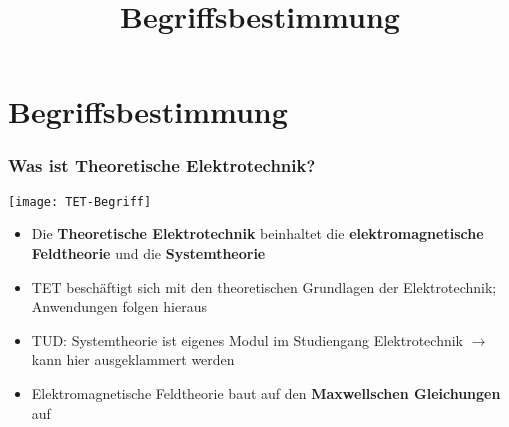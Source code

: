 

\title[TET: Begriffsbestimmung]{Begriffsbestimmung}


\maketitle

\section{Begriffsbestimmung}

\begin{frame}
  \frametitle{Was ist Theoretische Elektrotechnik?}
\centerline{\texttt{[image: TET-Begriff]}}

\begin{itemize}[<+->]
\item Die \textbf{Theoretische Elektrotechnik} beinhaltet die \textbf{elektromagnetische Feldtheorie} und die \textbf{Systemtheorie}
  \item TET beschäftigt sich mit den theoretischen Grundlagen der Elektrotechnik; Anwendungen folgen hieraus
\item TUD: Systemtheorie ist eigenes Modul im Studiengang Elektrotechnik \(\to\) kann hier ausgeklammert werden
\item Elektromagnetische Feldtheorie baut auf den \textbf{Maxwellschen Gleichungen} auf
\end{itemize}
\end{frame}


